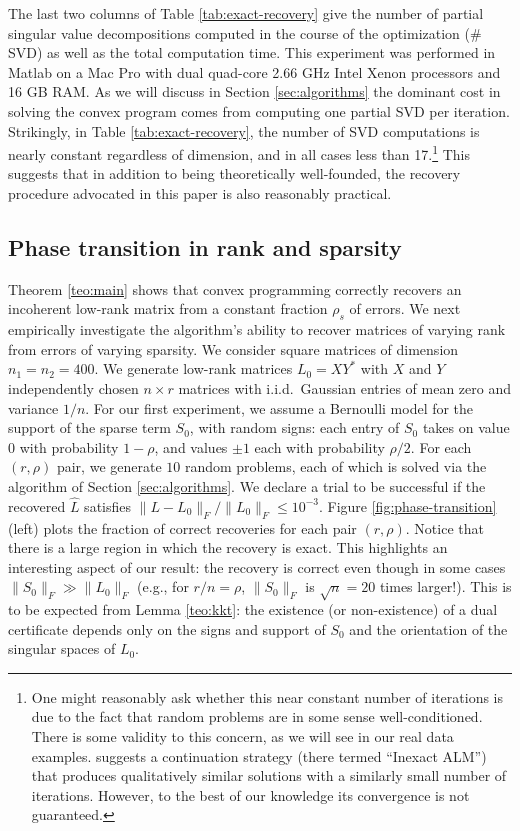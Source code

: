 The last two columns of Table \ref{tab:exact-recovery} give the number of partial singular value decompositions computed in the course of the optimization ($\#$ SVD) as well as the total computation time. This experiment was performed in Matlab on a Mac Pro with dual quad-core 2.66 GHz Intel Xenon processors and 16 GB RAM. As we will discuss in Section \ref{sec:algorithms} the dominant cost in solving the convex program comes from computing one partial SVD per iteration. Strikingly, in Table \ref{tab:exact-recovery}, the number of SVD computations is nearly constant regardless of dimension, and in all cases less than 17.\footnote{One might reasonably ask whether this near constant number of iterations is due to the fact that random problems are in some sense well-conditioned. There is some validity to this concern, as we will see in our real data examples. \cite{Lin2009-ALM} suggests a continuation strategy (there termed ``Inexact ALM'') that produces qualitatively similar solutions with a similarly small number of iterations. However, to the best of our knowledge its convergence is not guaranteed.} This suggests that in addition to being theoretically well-founded, the recovery procedure advocated in this paper is also reasonably practical.

\subsection{Phase transition in rank and sparsity} Theorem \ref{teo:main} shows that convex programming correctly recovers an incoherent low-rank matrix from a constant fraction $\rho_s$ of errors. We next empirically investigate the algorithm's ability to recover matrices of varying rank from errors of varying sparsity. We consider square matrices of dimension $n_1 = n_2 = 400$. We generate low-rank matrices $L_0 = X Y^*$ with $X$ and $Y$ independently chosen $n \times r$ matrices with i.i.d.~Gaussian entries of mean zero and variance $1/n$. For our first experiment, we assume a Bernoulli model for the support of the sparse term $S_0$, with random signs: each entry of $S_0$ takes on value $0$ with probability $1-\rho$, and values $\pm 1$ each with probability $\rho/2$. For each $(r,\rho)$
pair, we generate $10$ random problems, each of which is solved via the algorithm of Section \ref{sec:algorithms}. We declare a trial to be successful if the recovered $\hat L$ satisfies $\| L - L_0 \|_F /
\| L_0 \|_F \le 10^{-3}$. Figure \ref{fig:phase-transition} (left) plots the fraction of correct recoveries for each pair
$(r,\rho)$. Notice that there is a large region in which the recovery is exact. This highlights an interesting aspect of our result: the recovery is correct even though in some cases $\|S_0 \|_F \gg \| L_0
\|_F$ (e.g., for $r/n = \rho$, $\|S_0\|_F$ is $\sqrt{n} = 20$ times larger!). This is to be expected from Lemma \ref{teo:kkt}: the existence (or non-existence) of a dual certificate depends only on the signs and support of $S_0$ and the orientation of the singular spaces of $L_0$.

